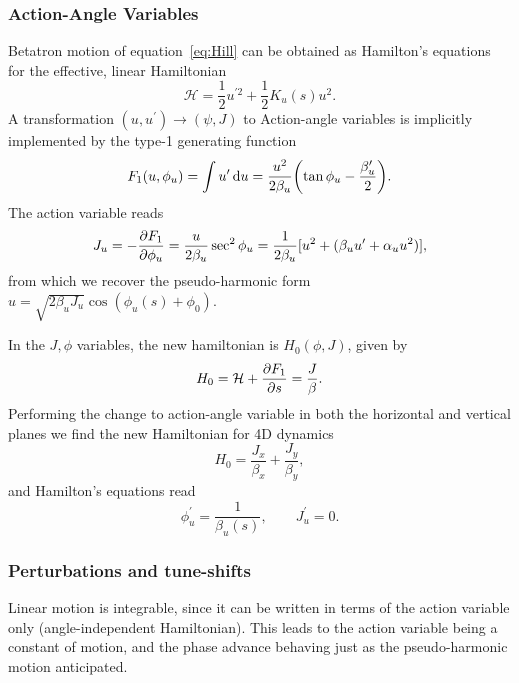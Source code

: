 \subsubsection{Action-Angle Variables}
Betatron motion of equation~\eqref{eq:Hill} can be obtained as Hamilton's equations for the effective, linear Hamiltonian
\begin{equation}
    \mathcal{H}=\frac{1}{2}u^{\prime2}+\frac{1}{2}K_u(s)u^2.
\end{equation}
A transformation $(u,u^\prime)\to(\psi, J)$ to Action-angle variables is implicitly implemented by the type-1 generating function
\begin{equation}
    F_1(u,\phi_u)=\int{u}^\prime\dd{{u}}=\frac{u^2}{2\beta_u}\qty(\tan \phi_u-\frac{\beta_u^\prime}{2}).
\end{equation}
The action variable reads
\begin{equation}
    J_u=-\pdv{F_1}{\phi_u} = \frac{u}{2\beta_u}\sec^2\phi_u = \frac{1}{2\beta_u}[u^2 + (\beta_u u^\prime + \alpha_u u^2)],
    \label{eq:action}
\end{equation}
from which we recover the pseudo-harmonic form $u=\sqrt{2\beta_u J_u}\cos(\phi_u(s)+\phi_0)$.

In the $J,\phi$ variables, the new hamiltonian is $H_0(\phi, J)$,  given by
\begin{equation}
    H_0=\mathcal{H}+\pdv{F_1}{s} = \frac{J}{\beta}.
\end{equation}
Performing the change to action-angle variable in both the horizontal and vertical planes we find the new Hamiltonian for 4D dynamics
\begin{equation}
    H_0= \frac{J_x}{\beta_x} +  \frac{J_y}{\beta_y},
\end{equation}
and Hamilton's equations read
\begin{equation}
    \phi_u^\prime = \frac{1}{\beta_u(s)},\qquad J_u^\prime=0.
\end{equation}
\subsubsection{Perturbations and tune-shifts}
Linear motion is integrable, since it can be written in terms of the action variable only (angle-independent Hamiltonian). This leads to the action variable being a constant of motion, and the phase advance behaving just as the pseudo-harmonic motion anticipated.

